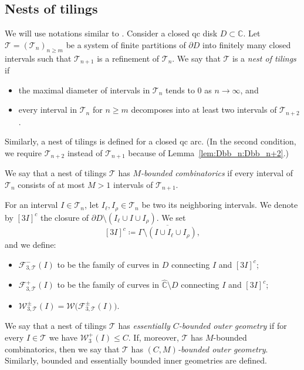 \documentclass{amsart}
\newcommand{\1}{{\mathbb 1 }}
\newcommand{\Fam}{{\mathcal F}}
\newcommand{\Width}{{\mathcal W}}
\newcommand\TT{\mathcal{T}}
\newcommand{\wC}{\widehat{\mathbb{C}}}
\newcommand{\C}{\mathbb{C}}
\theoremstyle{remark}
\numberwithin{equation}{section}
\theoremstyle{definition}
\begin{document}
 
\subsection{Nests of tilings}
\label{ss:NestOfTiling}
We will use notations similar to \cite[\S15.1]{L-book}. Consider a closed qc disk $D\subset \C$. Let $\TT=(\TT_n)_{n\ge m}$ be a system of finite partitions of $\partial D$ into finitely many closed intervals such that $\TT_{n+1}$ is a refinement of $\TT_n$. We say that $\TT$ is a \emph{nest of tilings} if 
\begin{itemize}
\item the maximal diameter of intervals in $\TT_n$ tends to $0$ as $n\to \infty$, and
\item every interval in $\TT_n$ for $n\ge m$ decomposes into at least two intervals of $\TT_{n+2}$.
\end{itemize}
 Similarly, a nest of tilings is defined for a closed qc arc. (In the second condition, we require $\TT_{n+2}$ instead of $\TT_{n+1}$ because of Lemma~\ref{lem:Dbb_n:Dbb_n+2}.) 



We say that a nest of tilings $\TT$ has \emph{$M$-bounded combinatorics} if every interval of $\TT_n$ consists of at most $M>1$ intervals of $\TT_{n+1}$.


For an interval $I\in \TT_n$, let $I_\ell, I_\rho\in \TT_n$ be two its neighboring intervals. We denote by $[3I]^c$ the closure of $\partial D\setminus (I_\ell\cup I\cup I_\rho)$.  We set \[[3I]^c\coloneqq \overline{\Gamma\setminus (I\cup I_\ell \cup I_\rho)},\] and we define:
\begin{itemize}
\item $\Fam^-_{3,\TT}(I)$ to be the family of curves in $D$ connecting $I$ and $[3I]^c$;
\item  $\Fam^+_{3,\TT}(I)$ to be the family of curves in $\wC\setminus D$ connecting $I$ and $[3I]^c$;
\item $\Width^\pm_{3,\TT}(I)=\Width\big(\Fam^\pm_{3,\TT}(I)\big)$.
\end{itemize}


We say that a nest of tilings $\TT$ has \emph{essentially $C$-bounded outer geometry} if for every $I\in \TT$ we have $\Width^+_3(I)\le C$. If, moreover, $\TT$ has $M$-bounded combinatorics, then we say that $\TT$ has \emph{$(C,M)$-bounded outer geometry}. Similarly, bounded and essentially bounded inner geometries are defined.
\end{document}
